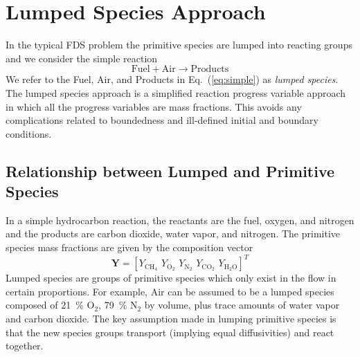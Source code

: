 \section{Lumped Species Approach}
\label{sec:lumpedspecies}

In the typical FDS problem the primitive species are lumped into reacting groups and we consider the simple reaction
\begin{equation}\label{eq:simple}
\mathrm{Fuel + Air \rightarrow Products}
\end{equation}
We refer to the Fuel, Air, and Products in Eq.~(\ref{eq:simple}) as \emph{lumped species}.  The lumped species approach is a simplified reaction progress variable approach~\cite{fox2003} in which all the progress variables are mass fractions. This avoids any complications related to boundedness and ill-defined initial and boundary conditions.

\subsection{Relationship between Lumped and Primitive Species}

In a simple hydrocarbon reaction, the reactants are the fuel, oxygen, and nitrogen and the products are carbon dioxide, water vapor, and nitrogen. The primitive species mass fractions are given by the composition vector
\begin{equation}\label{eq:prim_vector}
\mathbf{Y} = [Y_{\mathrm{CH}_4}\, \, Y_{\mathrm{O}_2}\, \, Y_{\mathrm{N}_2}\, \, Y_{\mathrm{CO}_2}\, \, Y_{\mathrm{H}_2\mathrm{O}}]^T
\end{equation}
Lumped species are groups of primitive species which only exist in the flow in certain proportions. For example, Air can be assumed to be a lumped species composed of 21~\% O$_2$, 79~\% N$_2$ by volume, plus trace amounts of water vapor and carbon dioxide. The key assumption made in lumping primitive species is that the new species groups transport (implying equal diffusivities) and react together.


